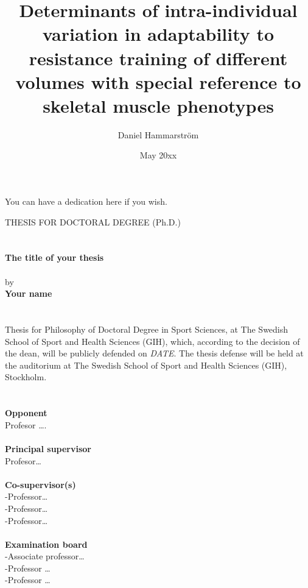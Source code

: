 \documentclass[twoside,10pt]{gihclass} %
\title{Determinants of intra-individual variation in adaptability to resistance training of different volumes with special reference to skeletal muscle phenotypes}
\author{Daniel Hammarström}
\date{May 20xx}
\begin{document}


\frontmatter %
  \maketitle
  \begin{dedication}
\vspace*{\fill}
 You can have a dedication here if you wish.
\vspace*{\fill}
  \end{dedication}
\begin{defence}
    THESIS FOR DOCTORAL DEGREE (Ph.D.)\\
    ~\\
    ~\\
    \textbf{The title of your thesis}\\
    ~\\
    by\\
    \textbf{Your name}\\
    ~\\
    ~\\
    Thesis for Philosophy of Doctoral Degree in Sport Sciences, at The Swedish School of Sport and Health Sciences (GIH), which, according to the decision of the dean, will be publicly defended on \emph{DATE}. The thesis defense will be held at the auditorium at The Swedish School of Sport and Health Sciences (GIH), Stockholm.\\
    ~\\
    ~\\
    \textbf{Opponent}\\
    Profesor \ldots.\\
    ~\\
    \textbf{Principal supervisor}\\
    Profesor\ldots{}\\
    ~\\
    \textbf{Co-supervisor(s)}\\
    -Professor\ldots{}\\
    -Professor\ldots{}\\
    -Professor\ldots{}\\
    ~\\
    \textbf{Examination board}\\
    -Associate professor\ldots{}\\
    -Professor \ldots{}\\
    -Professor \ldots{}
  \end{defence}
\end{document}
